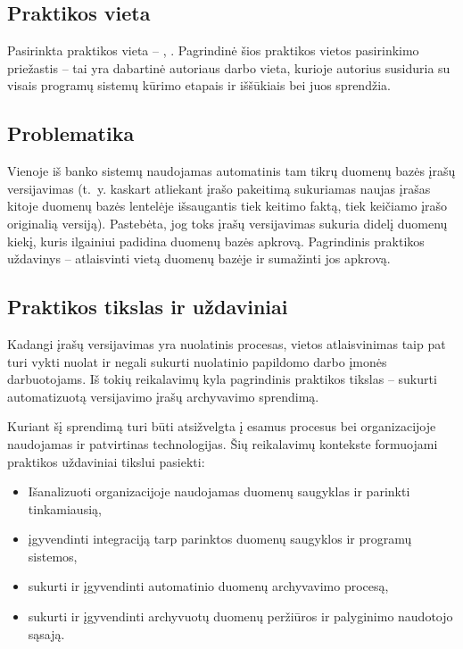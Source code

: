 
\subsection*{Praktikos vieta}
Pasirinkta praktikos vieta -- \SEB, \PDT. Pagrindinė šios praktikos vietos pasirinkimo priežastis -- tai yra dabartinė autoriaus darbo vieta, kurioje autorius susiduria su visais programų sistemų kūrimo etapais ir iššūkiais bei juos sprendžia. 

\subsection*{Problematika}
Vienoje iš banko sistemų naudojamas automatinis tam tikrų duomenų bazės įrašų versijavimas (t.~y. kaskart atliekant įrašo pakeitimą sukuriamas naujas įrašas kitoje duomenų bazės lentelėje išsaugantis tiek keitimo faktą, tiek keičiamo įrašo originalią versiją). Pastebėta, jog toks įrašų versijavimas sukuria didelį duomenų kiekį, kuris ilgainiui padidina duomenų bazės apkrovą. Pagrindinis praktikos uždavinys -- atlaisvinti vietą duomenų bazėje ir sumažinti jos apkrovą.

\subsection*{Praktikos tikslas ir uždaviniai}
Kadangi įrašų versijavimas yra nuolatinis procesas, vietos atlaisvinimas taip pat turi vykti nuolat ir negali sukurti nuolatinio papildomo darbo įmonės darbuotojams. Iš tokių reikalavimų kyla pagrindinis praktikos tikslas -- sukurti automatizuotą versijavimo įrašų archyvavimo sprendimą.

Kuriant šį sprendimą turi būti atsižvelgta į esamus procesus bei organizacijoje naudojamas ir patvirtinas technologijas. Šių reikalavimų kontekste formuojami praktikos uždaviniai tikslui pasiekti:
\begin{itemize}
    \item Išanalizuoti organizacijoje naudojamas duomenų saugyklas ir parinkti tinkamiausią,
    \item įgyvendinti integraciją tarp parinktos duomenų saugyklos ir programų sistemos,
    \item sukurti ir įgyvendinti automatinio duomenų archyvavimo procesą,
    \item sukurti ir įgyvendinti archyvuotų duomenų peržiūros ir palyginimo naudotojo sąsają.
\end{itemize}   

